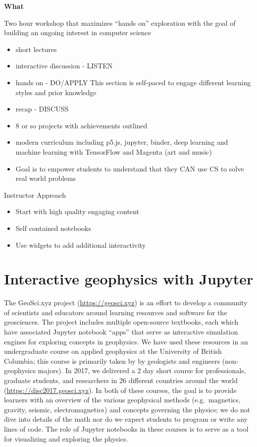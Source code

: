 \documentclass[]{book}
\providecommand{\tightlist}{%
  \setlength{\itemsep}{0pt}\setlength{\parskip}{0pt}}
\begin{document}
\textbf{What}

Two hour workshop that maximizes ``hands on'' exploration with the goal
of building an ongoing interest in computer science

\begin{itemize}
\tightlist
\item
  short lectures
\item
  interactive discussion - LISTEN
\item
  hands on - DO/APPLY This section is self-paced to engage different
  learning styles and prior knowledge
\item
  recap - DISCUSS
\item
  8 or so projects with achievements outlined
\item
  modern curriculum including p5.js, jupyter, binder, deep learning and
  machine learning with TensorFlow and Magenta (art and music)
\item
  Goal is to empower students to understand that they CAN use CS to
  solve real world problems
\end{itemize}

Instructor Approach

\begin{itemize}
\tightlist
\item
  Start with high quality engaging content
\item
  Self contained notebooks
\item
  Use widgets to add additional interactivity
\end{itemize}

\section{Interactive geophysics with
Jupyter}\label{interactive-geophysics-with-jupyter}

The GeoSci.xyz project (\url{https://geosci.xyz}) is an effort to
develop a community of scientists and educators around learning
resources and software for the geosciences. The project includes
multiple open-source textbooks, each which have associated Jupyter
notebook ``apps'' that serve as interactive simulation engines for
exploring concepts in geophysics. We have used these resources in an
undergraduate course on applied geophysics at the University of British
Columbia; this course is primarily taken by by geologists and engineers
(non-geophysics majors). In 2017, we delivered a 2 day short course for
professionals, graduate students, and researchers in 26 different
countries around the world (\url{https://disc2017.geosci.xyz}). In both
of these courses, the goal is to provide learners with an overview of
the various geophysical methods (e.g.~magnetics, gravity, seismic,
electromagnetics) and concepts governing the physics; we do not dive
into details of the math nor do we expect students to program or write
any lines of code. The role of Jupyter notebooks in these courses is to
serve as a tool for visualizing and exploring the physics.
\end{document}
